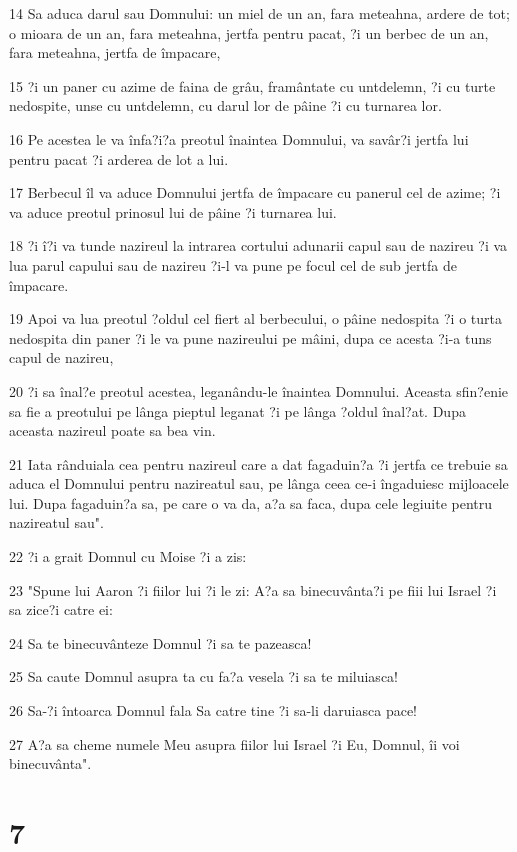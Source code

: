 \par 14 Sa aduca darul sau Domnului: un miel de un an, fara meteahna, ardere de tot; o mioara de un an, fara meteahna, jertfa pentru pacat, ?i un berbec de un an, fara meteahna, jertfa de împacare,
\par 15 ?i un paner cu azime de faina de grâu, framântate cu untdelemn, ?i cu turte nedospite, unse cu untdelemn, cu darul lor de pâine ?i cu turnarea lor.
\par 16 Pe acestea le va înfa?i?a preotul înaintea Domnului, va savâr?i jertfa lui pentru pacat ?i arderea de lot a lui.
\par 17 Berbecul îl va aduce Domnului jertfa de împacare cu panerul cel de azime; ?i va aduce preotul prinosul lui de pâine ?i turnarea lui.
\par 18 ?i î?i va tunde nazireul la intrarea cortului adunarii capul sau de nazireu ?i va lua parul capului sau de nazireu ?i-l va pune pe focul cel de sub jertfa de împacare.
\par 19 Apoi va lua preotul ?oldul cel fiert al berbecului, o pâine nedospita ?i o turta nedospita din paner ?i le va pune nazireului pe mâini, dupa ce acesta ?i-a tuns capul de nazireu,
\par 20 ?i sa înal?e preotul acestea, leganându-le înaintea Domnului. Aceasta sfin?enie sa fie a preotului pe lânga pieptul leganat ?i pe lânga ?oldul înal?at. Dupa aceasta nazireul poate sa bea vin.
\par 21 Iata rânduiala cea pentru nazireul care a dat fagaduin?a ?i jertfa ce trebuie sa aduca el Domnului pentru nazireatul sau, pe lânga ceea ce-i îngaduiesc mijloacele lui. Dupa fagaduin?a sa, pe care o va da, a?a sa faca, dupa cele legiuite pentru nazireatul sau".
\par 22 ?i a grait Domnul cu Moise ?i a zis:
\par 23 "Spune lui Aaron ?i fiilor lui ?i le zi: A?a sa binecuvânta?i pe fiii lui Israel ?i sa zice?i catre ei:
\par 24 Sa te binecuvânteze Domnul ?i sa te pazeasca!
\par 25 Sa caute Domnul asupra ta cu fa?a vesela ?i sa te miluiasca!
\par 26 Sa-?i întoarca Domnul fala Sa catre tine ?i sa-li daruiasca pace!
\par 27 A?a sa cheme numele Meu asupra fiilor lui Israel ?i Eu, Domnul, îi voi binecuvânta".

\chapter{7}

